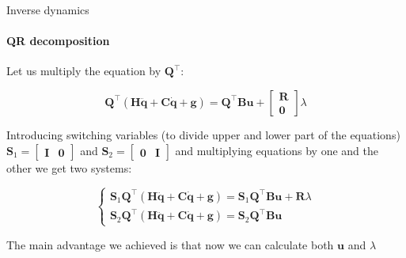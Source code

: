 \documentclass{beamer}
\begin{document}
\begin{frame}{Inverse dynamics}
	\framesubtitle{QR decomposition}
	\begin{flushleft}
		
		Let us multiply the equation by $\mathbf{Q}^\top$:
		
		\begin{equation}
			\mathbf{Q}^\top (\mathbf{H}\ddot{\mathbf{q}} + \mathbf{C}\dot{\mathbf{q}} + \mathbf{g}) = \mathbf{Q}^\top\mathbf{B}\mathbf{u} + \begin{bmatrix} \mathbf{R} \\ \mathbf{0}  \end{bmatrix} \lambda
		\end{equation}
		
		Introducing switching variables (to divide upper and lower part of the equations) $\mathbf{S}_1 = \begin{bmatrix} \mathbf{I} & \mathbf{0}  \end{bmatrix}$ and $\mathbf{S}_2 = \begin{bmatrix} \mathbf{0} & \mathbf{I}  \end{bmatrix}$ and multiplying equations by one and the other we get two systems:
		
		\begin{equation}
			\begin{cases}
				\mathbf{S}_1 \mathbf{Q}^\top (\mathbf{H}\ddot{\mathbf{q}} + \mathbf{C}\dot{\mathbf{q}} + \mathbf{g}) = \mathbf{S}_1\mathbf{Q}^\top\mathbf{B}\mathbf{u} + \mathbf{R} \lambda \\
				\mathbf{S}_2 \mathbf{Q}^\top (\mathbf{H}\ddot{\mathbf{q}} + \mathbf{C}\dot{\mathbf{q}} + \mathbf{g}) = \mathbf{S}_2\mathbf{Q}^\top\mathbf{B}\mathbf{u}
			\end{cases}
		\end{equation}
		
		The main advantage we achieved is that now we can calculate both $\mathbf{u}$ and $\lambda$
		
	\end{flushleft}
\end{frame}
\end{document}
